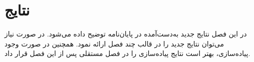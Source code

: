 
\chapter{نتایج}

در این فصل نتایج جدید به‌دست‌آمده در پایان‌نامه توضیح داده می‌شود.
در صورت نیاز می‌توان نتایج جدید را در قالب چند فصل ارائه نمود.
همچنین در صورت وجود پیاده‌سازی، بهتر است نتایج پیاده‌سازی را 
در فصل مستقلی پس از این فصل قرار داد.
